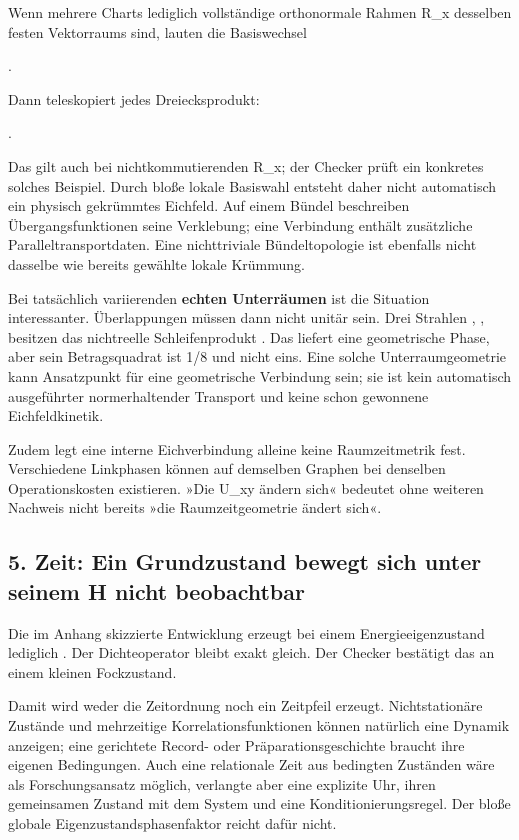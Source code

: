 Wenn mehrere Charts lediglich vollständige orthonormale Rahmen R\_x
desselben festen Vektorraums sind, lauten die Basiswechsel

.

Dann teleskopiert jedes Dreiecksprodukt:

.

Das gilt auch bei nichtkommutierenden R\_x; der Checker prüft ein
konkretes solches Beispiel. Durch bloße lokale Basiswahl entsteht daher
nicht automatisch ein physisch gekrümmtes Eichfeld. Auf einem Bündel
beschreiben Übergangsfunktionen seine Verklebung; eine Verbindung
enthält zusätzliche Paralleltransportdaten. Eine nichttriviale
Bündeltopologie ist ebenfalls nicht dasselbe wie bereits gewählte lokale
Krümmung.

Bei tatsächlich variierenden \textbf{echten Unterräumen} ist die
Situation interessanter. Überlappungen  müssen dann
nicht unitär sein. Drei Strahlen , ,
 besitzen das nichtreelle Schleifenprodukt
. Das liefert eine geometrische Phase, aber sein
Betragsquadrat ist 1/8 und nicht eins. Eine solche Unterraumgeometrie
kann Ansatzpunkt für eine geometrische Verbindung sein; sie ist kein
automatisch ausgeführter normerhaltender Transport und keine schon
gewonnene Eichfeldkinetik.

Zudem legt eine interne Eichverbindung alleine keine Raumzeitmetrik
fest. Verschiedene Linkphasen können auf demselben Graphen bei denselben
Operationskosten existieren. »Die U\_xy ändern sich« bedeutet ohne
weiteren Nachweis nicht bereits »die Raumzeitgeometrie ändert sich«.

\subsection{5. Zeit: Ein Grundzustand bewegt sich unter seinem H nicht
beobachtbar}\label{zeit-ein-grundzustand-bewegt-sich-unter-seinem-h-nicht-beobachtbar}

Die im Anhang skizzierte Entwicklung  erzeugt
bei einem Energieeigenzustand lediglich . Der
Dichteoperator bleibt exakt gleich. Der Checker bestätigt das an einem
kleinen Fockzustand.

Damit wird weder die Zeitordnung noch ein Zeitpfeil erzeugt.
Nichtstationäre Zustände und mehrzeitige Korrelationsfunktionen können
natürlich eine Dynamik anzeigen; eine gerichtete Record- oder
Präparationsgeschichte braucht ihre eigenen Bedingungen. Auch eine
relationale Zeit aus bedingten Zuständen wäre als Forschungsansatz
möglich, verlangte aber eine explizite Uhr, ihren gemeinsamen Zustand
mit dem System und eine Konditionierungsregel. Der bloße globale
Eigenzustandsphasenfaktor reicht dafür nicht.

